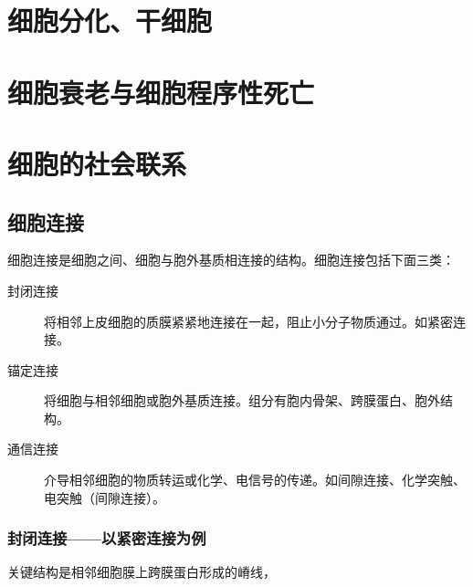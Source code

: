 \section{细胞分化、干细胞}

\section{细胞衰老与细胞程序性死亡}

\section{细胞的社会联系}

\subsection{细胞连接}

细胞连接是细胞之间、细胞与胞外基质相连接的结构。细胞连接包括下面三类：

\begin{description}
	\item[封闭连接] 将相邻上皮细胞的质膜紧紧地连接在一起，阻止小分子物质通过。如紧密连接。
	\item[锚定连接] 将细胞与相邻细胞或胞外基质连接。组分有胞内骨架、跨膜蛋白、胞外结构。
	\item[通信连接] 介导相邻细胞的物质转运或化学、电信号的传递。如间隙连接、化学突触、电突触（间隙连接）。
\end{description}

\subsubsection{封闭连接——以紧密连接为例}

关键结构是相邻细胞膜上跨膜蛋白形成的嵴线，
